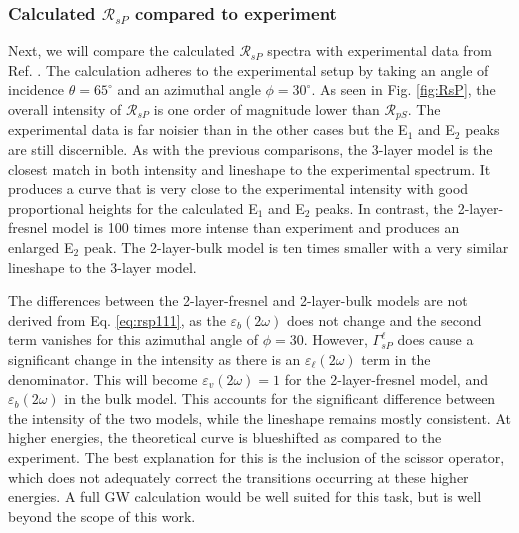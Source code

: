 
\subsubsection{Calculated \texorpdfstring{$\mathcal{R}_{sP}$}{RsP} compared to 
experiment}\label{sec:1x1RsP}

Next, we will compare the calculated $\mathcal{R}_{sP}$ spectra with
experimental data from Ref. \cite{mejiaPRB02}. The calculation adheres to the
experimental setup by taking an angle of incidence $\theta=65^{\circ}$ and an
azimuthal angle $\phi=30^\circ$. As seen in Fig. \ref{fig:RsP}, the overall
intensity of $\mathcal{R}_{sP}$ is one order of magnitude lower than
$\mathcal{R}_{pS}$. The experimental data is far noisier than in the other cases
but the E$_{1}$ and E$_{2}$ peaks are still discernible. As with the previous
comparisons, the 3-layer model is the closest match in both intensity and
lineshape to the experimental spectrum. It produces a curve that is very close
to the experimental intensity with good proportional heights for the calculated
E$_{1}$ and E$_{2}$ peaks. In contrast, the 2-layer-fresnel model is 100 times
more intense than experiment and produces an enlarged E$_{2}$ peak. The
2-layer-bulk model is ten times smaller with a very similar lineshape to the
3-layer model.

The differences between the 2-layer-fresnel and 2-layer-bulk models are not
derived from Eq. \eqref{eq:rsp111}, as the $\varepsilon_{b}(2\omega)$ does not
change and the second term vanishes for this azimuthal angle of $\phi = 30$.
However, $\Gamma^{\ell}_{sP}$ does cause a significant change in the intensity
as there is an $\varepsilon_{\ell}(2\omega)$ term in the denominator. This will
become $\varepsilon_{v}(2\omega) = 1$ for the 2-layer-fresnel model, and
$\varepsilon_{b}(2\omega)$ in the bulk model. This accounts for the significant
difference between the intensity of the two models, while the lineshape remains
mostly consistent. At higher energies, the theoretical curve is blueshifted as
compared to the experiment. The best explanation for this is the inclusion of
the scissor operator, which does not adequately correct the transitions
occurring at these higher energies. A full GW calculation would be well suited
for this task, but is well beyond the scope of this work.

